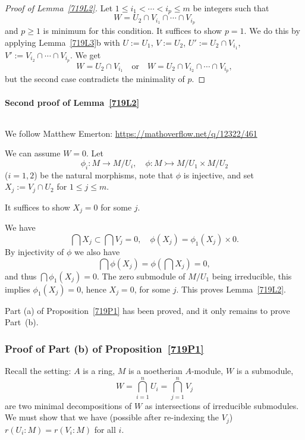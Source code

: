 \documentclass[parskip=half,fontsize=12pt]{scrartcl}%
\newcommand{\mono}{\rightarrowtail}
\begin{document}
\begin{proof}[Proof of Lemma~\ref{719L2}] Let $1\le i_1<\cdots<i_p\le m$ be integers such that 
$$
W=U_2\cap V_{i_1}\cap\cdots\cap V_{i_p}
$$ 
and $p\ge1$ is minimum for this condition. It suffices to show $p=1$. We do this by applying Lemma~\ref{719L3}b with $U:=U_1$, $V:=U_2$, $U':=U_2\cap V_{i_1}$, $V':=V_{i_2}\cap\cdots\cap V_{i_p}$. We get %
$$
W=U_2\cap V_{i_1}\quad\text{or}\quad W=U_2\cap V_{i_2}\cap\cdots\cap V_{i_p},
$$ 
but the second case contradicts the minimality of $p$.
\end{proof}

\paragraph{Second proof of Lemma~\ref{719L2}}${}$\medskip%

We follow Matthew Emerton: \href{https://mathoverflow.net/q/12322/461}{https://mathoverflow.net/q/12322/461}%

We can assume $W=0$. Let 
$$
\phi_i:M\to M/U_i,\quad\phi:M\mono M/U_1\times M/U_2
$$ 
($i=1,2$) be the natural morphisms, note that $\phi$ is injective, and set $X_j:=V_j\cap U_2$ for $1\le j\le m$. 

It suffices to show $X_j=0$ for some $j$.

We have 
$$
\bigcap X_j\subset \bigcap V_j=0,\quad\phi(X_j)=\phi_1(X_j)\times0.
$$ 
By injectivity of $\phi$ we also have 
$$
\bigcap\phi(X_j)=\phi\left(\bigcap X_j\right)=0,
$$ 
and thus $\bigcap\phi_1(X_j)=0$. The zero submodule of $M/U_1$ being ir\-re\-ducible, this implies $\phi_1(X_j)=0$, hence $X_j=0$, for some $j$. This proves Lemma~\ref{719L2}.

Part (a) of Proposition~\ref{719P1} has been proved, and it only remains to prove Part~(b).

\subsubsection{Proof of Part (b) of Proposition~\ref{719P1}}%

Recall the setting: $A$ is a ring, $M$ is a noetherian $A$-module, $W$ is a submodule, 
$$
W=\bigcap_{i=1}^nU_i=\bigcap_{j=1}^nV_j
$$ 
are two minimal decompositions of $W$ as intersections of irreducible submodules. We must show that we have (possible after re-indexing the $V_j$) $r(U_i:M)=r(V_i:M)$ for all $i$.
\end{document}
